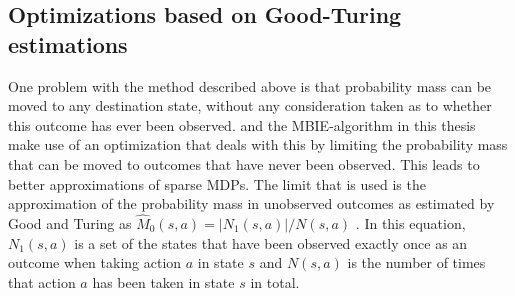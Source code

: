 \subsection{Optimizations based on Good-Turing estimations}

\label{sec:mbie_gt}

One problem with the method described above is that probability mass can be
moved to any destination state, without any consideration taken as to whether this
outcome has ever been observed. \textcite{dietterich2013pac} and the 
MBIE-algorithm in this thesis make use of an optimization that deals with this by 
limiting the probability mass that can be moved to outcomes that have never been 
observed. This leads to better approximations of sparse MDPs. The limit that is used is the 
approximation of the probability mass in unobserved outcomes as estimated by 
Good and Turing as $\hat{M}_0(s,a) = |N_1(s,a)| / N(s,a)$ \parencite{gtpaper}. 
In this equation, $N_1(s,a)$ is a set of the states that have been observed exactly
once as an outcome when taking action $a$ in state $s$ and $N(s,a)$ is the
number of times that action $a$ has been taken in state $s$ in total. 